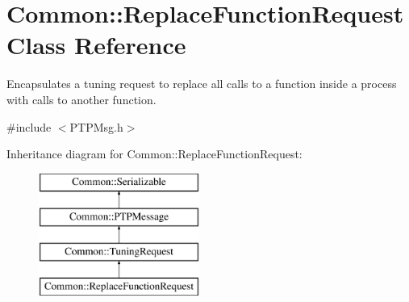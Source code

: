\hypertarget{class_common_1_1_replace_function_request}{\section{Common\-:\-:Replace\-Function\-Request Class Reference}
\label{class_common_1_1_replace_function_request}
}


Encapsulates a tuning request to replace all calls to a function inside a process with calls to another function.  




{\ttfamily \#include $<$P\-T\-P\-Msg.\-h$>$}

Inheritance diagram for Common\-:\-:Replace\-Function\-Request\-:\begin{figure}[H]
\begin{center}
\leavevmode
\includegraphics[height=4.000000cm]{class_common_1_1_replace_function_request}
\end{center}
\end{figure}
